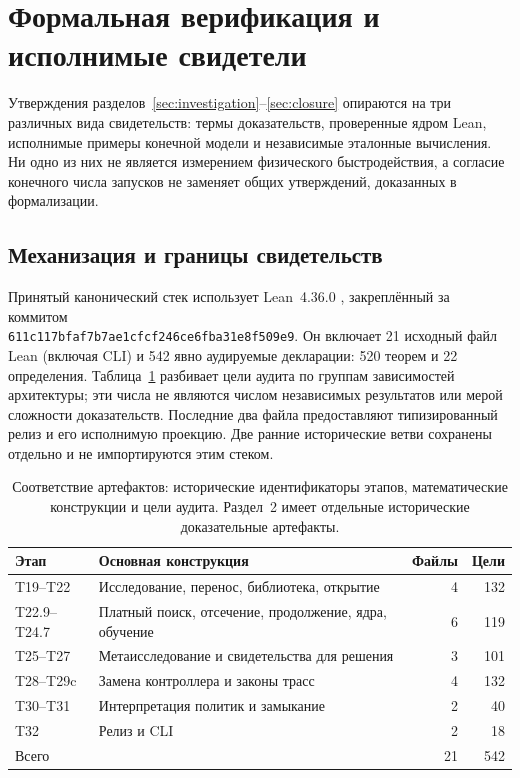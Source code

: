 \documentclass[10pt,a4paper]{article}
\begin{document}
\section{Формальная верификация и исполнимые свидетели}\label{sec:verification}
Утверждения разделов~\ref{sec:investigation}--\ref{sec:closure} опираются на три различных вида свидетельств: термы доказательств, проверенные ядром Lean, исполнимые примеры конечной модели и независимые эталонные вычисления. Ни одно из них не является измерением физического быстродействия, а согласие конечного числа запусков не заменяет общих утверждений, доказанных в формализации.

\subsection{Механизация и границы свидетельств}
Принятый канонический стек использует Lean~4.36.0 \cite{lean4}, закреплённый за коммитом\\
\texttt{611c117bfaf7b7ae1cfcf246ce6fba31e8f509e9}. Он включает 21 исходный файл Lean (включая CLI) и 542 явно аудируемые декларации: 520 теорем и 22 определения. Таблица~\ref{tab:formal-audit} разбивает цели аудита по группам зависимостей архитектуры; эти числа не являются числом независимых результатов или мерой сложности доказательств. Последние два файла предоставляют типизированный релиз и его исполнимую проекцию. Две ранние исторические ветви сохранены отдельно и не импортируются этим стеком.

\begin{table}[htbp]
\centering\small
\caption{Соответствие артефактов: исторические идентификаторы этапов, математические конструкции и цели аудита. Раздел~2 имеет отдельные исторические доказательные артефакты.}\label{tab:formal-audit}
\begin{tabularx}{\linewidth}{@{}lXrr@{}}\toprule
Этап & Основная конструкция & Файлы & Цели\\\midrule
T19--T22 & Исследование, перенос, библиотека, открытие & 4 & 132\\
T22.9--T24.7 & Платный поиск, отсечение, продолжение, ядра, обучение & 6 & 119\\
T25--T27 & Метаисследование и свидетельства для решения & 3 & 101\\
T28--T29c & Замена контроллера и законы трасс & 4 & 132\\
T30--T31 & Интерпретация политик и замыкание & 2 & 40\\
T32 & Релиз и CLI & 2 & 18\\\midrule
Всего & & 21 & 542\\\bottomrule
\end{tabularx}
\end{table}
\end{document}
